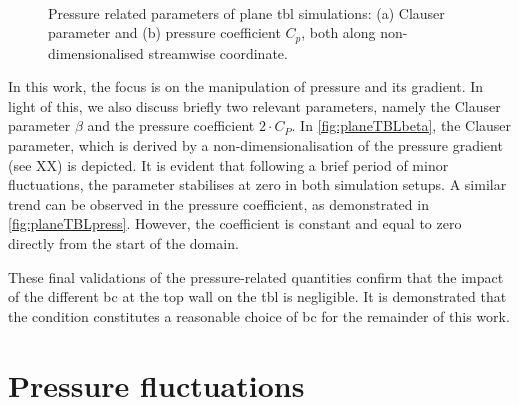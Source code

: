 \begin{figure}[h!]
\centering
\begin{subfigure}[t]{0.495\textwidth}
    \subcaption{}
    \centering
    
    \label{fig:planeTBLbeta}
\end{subfigure}
\hfill
\begin{subfigure}[t]{0.495\textwidth}
    \centering
    \subcaption{}
    
    \label{fig:planeTBLpress}
\end{subfigure}
\\[-15pt]
\caption[Pressure related parameters of plane \acrshort{tbl} simulations]{Pressure related parameters of plane \acrshort{tbl} simulations: (a) Clauser parameter and (b) pressure coefficient $C_p$, both along non-dimensionalised streamwise coordinate.}
\end{figure}

In this work, the focus is on the manipulation of pressure and its gradient.
In light of this, we also discuss briefly two relevant parameters, namely the Clauser parameter $\beta$ and the pressure coefficient $2 \cdot C_P$.
In \autoref{fig:planeTBLbeta}, the Clauser parameter, which is derived by a non-dimensionalisation of the pressure gradient (see XX) is depicted.
It is evident that following a brief period of minor fluctuations, the parameter stabilises at zero in both simulation setups.
A similar trend can be observed in the pressure coefficient, as demonstrated in \autoref{fig:planeTBLpress}.
However, the coefficient is constant and equal to zero directly from the start of the domain. 

These final validations of the pressure-related quantities confirm that the impact of the different \acrshort{bc} at the top wall on the \acrshort{tbl} is negligible.
It is demonstrated that the  condition constitutes a reasonable choice of \acrshort{bc} for the remainder of this work.


\section{Pressure fluctuations} \label{sec:pressFluc}


